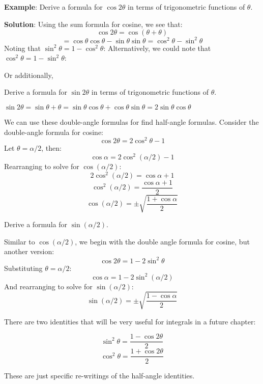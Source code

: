 \textbf{Example}: Derive a formula for $\cos{2\theta}$ in terms of 
trigonometric functions of $\theta$.

\textbf{Solution}: Using the sum formula for cosine, we see that:
$$\cos{2\theta} = \cos{\left( \theta + \theta \right)}$$
$$= \cos{\theta}\cos{\theta} - \sin{\theta}\sin{\theta} = \cos^2{\theta} - 
\sin^2{\theta}$$
Noting that $\sin^2{\theta} = 1 - \cos^2{\theta}$:
Alternatively, we could note that $\cos^2{\theta} = 1 - \sin^2{\theta}$:

Or additionally,
\boxed{$$\cos{2\theta} = \cos^2\theta - \sin^2\theta$$}


\begin{Exercise}[label = double_sine]
Derive a formula for $\sin{2\theta}$ in terms of trigonometric functions of 
$\theta$.
\vspace{50mm}
\end{Exercise}

\begin{Answer}[ref = double_sine]
$\sin{2\theta} = \sin{\theta + \theta} = \sin{\theta}\cos{\theta} + \cos{
\theta}\sin{\theta} = 2\sin{\theta}\cos{\theta}$
\end{Answer}

We can use these double-angle formulas for find half-angle formulas. Consider 
the double-angle formula for cosine:
$$\cos{2\theta} = 2\cos^2{\theta} - 1$$
Let $\theta = \alpha / 2$, then:
$$\cos{\alpha} = 2\cos^2{ \left( \alpha / 2 \right) } - 1$$
Rearranging to solve for $\cos{ \left( \alpha / 2 \right) }$:
$$2\cos^2{ \left( \alpha / 2 \right) } = \cos{\alpha} + 1$$
$$\cos^2{ \left( \alpha / 2 \right)} = \frac{\cos{\alpha} + 1}{2}$$
$$\cos{ \left( \alpha / 2 \right)} = \pm \sqrt{\frac{1 + \cos{\alpha}}{2}}$$

\begin{Exercise}[label = half_sine]
Derive a formula for $\sin{ \left( \alpha / 2 \right)}$.
\vspace{75mm}
\end{Exercise}

\begin{Answer}[ref = half_sine]
Similar to $\cos{ \left( \alpha / 2 \right)}$, we begin with the double angle 
formula for cosine, but another version:
$$\cos{2\theta} = 1 - 2\sin^2{\theta}$$
Substituting $\theta = \alpha / 2$:
$$\cos{\alpha} = 1 - 2\sin^2{ \left( \alpha / 2 \right)}$$
And rearranging to solve for $\sin{ \left( \alpha / 2 \right) }$:
$$\sin{ \left( \alpha / 2 \right) } = \pm \sqrt{\frac{1 - \cos{\alpha}}{2}}$$
\end{Answer}

There are two identities that will be very useful for integrals in a future 
chapter:
\begin{mdframed}[style=important, frametitle={Squared Trigonometric 
Identities}]
$$\sin^2{\theta} = \frac{1 - \cos{2\theta}}{2}$$
$$\cos^2{\theta} = \frac{1 + \cos{2\theta}}{2}$$
\end{mdframed}

These are just specific re-writings of the half-angle identities. 